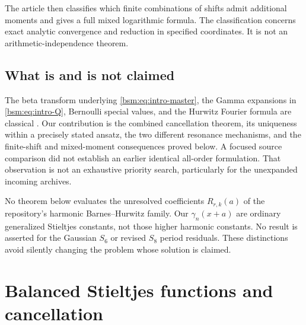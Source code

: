\documentclass[11pt,letterpaper]{article}
\numberwithin{equation}{section}
\theoremstyle{definition}\newtheorem{definition}[theorem]{Definition}
\theoremstyle{remark}\newtheorem{remark}[theorem]{Remark}
\begin{document}
The article then classifies which finite combinations of shifts admit
additional moments and gives a full mixed logarithmic formula. The
classification concerns exact analytic convergence and reduction in
specified coordinates. It is not an arithmetic-independence theorem.

\subsection{What is and is not claimed}

The beta transform underlying \eqref{bsm:eq:intro-master}, the Gamma
expansions in \eqref{bsm:eq:intro-Q}, Bernoulli special values, and the
Hurwitz Fourier formula are classical \cite{DLMFHurwitz,DLMFGamma,Zagier}.
Our contribution is the combined cancellation theorem, its uniqueness
within a precisely stated ansatz, the two different resonance mechanisms,
and the finite-shift and mixed-moment consequences proved below. A
focused source comparison did not establish an earlier identical
all-order formulation. That observation is not an exhaustive priority
search, particularly for the unexpanded incoming archives.

No theorem below evaluates the unresolved coefficients $R_{r,k}(a)$ of
the repository's harmonic Barnes--Hurwitz family. Our $\gamma_n(x+a)$
are ordinary generalized Stieltjes constants, not those higher harmonic
constants. No result is asserted for the Gaussian $S_6$ or revised
$S_8$ period residuals. These distinctions avoid silently changing the
problem whose solution is claimed.

\section{Balanced Stieltjes functions and cancellation}\label{bsm:sec:balanced}
\end{document}
